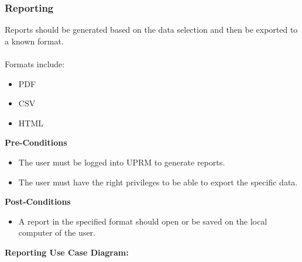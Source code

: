 \subsubsection{Reporting}
Reports should be generated based on the data selection and then be exported to a known format.\\ \\
Formats include:
\begin{itemize}
	\item PDF
	\item CSV
	\item HTML\\
\end{itemize}
\textbf{Pre-Conditions}
\begin{itemize}
	\item The user must be logged into UPRM to generate reports.
	\item The user must have the right privileges to be able to export the specific data.\\
\end{itemize}
\textbf{Post-Conditions}
\begin{itemize}
	\item A report in the specified format should open or be saved on the local computer of the user.\\
\end{itemize}
\textbf{Reporting Use Case Diagram:}\\
\centerline{}